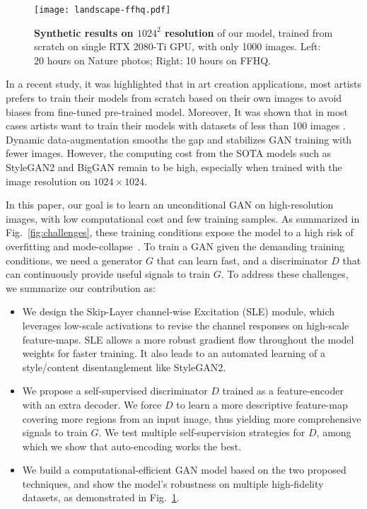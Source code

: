 \documentclass{article} \usepackage{iclr2021_conference,times}
\begin{document}
\begin{figure}[h]
\begin{center}
\texttt{[image: landscape-ffhq.pdf]}
\end{center}
\caption{\textbf{Synthetic results on $1024^2$ resolution} of our model, trained from scratch on single RTX 2080-Ti GPU, with only 1000 images. Left: 20 hours on Nature photos; Right: 10 hours on FFHQ.}
\label{fig:quality-ours}
\end{figure}

In a recent study, it was highlighted that in art creation applications, most artists prefers to train their models from scratch based on their own images to avoid biases from fine-tuned pre-trained model. Moreover, It was shown that in most cases artists want to train their models with datasets of less than 100 images \citep{elgammal2020artists}. Dynamic data-augmentation \citep{karras2020training,zhao2020differentiable} smooths the gap and stabilizes GAN training with fewer images. However, the computing cost from the SOTA models such as StyleGAN2 \citep{karras2020analyzing} and BigGAN \citep{brock2018large} remain to be high, especially when trained with the image resolution on $1024\times1024$. 

In this paper, our goal is to learn an unconditional GAN on high-resolution images, with low computational cost and few training samples. As summarized in Fig.~\ref{fig:challenges}, these training conditions expose the model to a high risk of  overfitting and mode-collapse~\citep{arjovsky2017towards,zhang2018pa}. To train a GAN given the demanding training conditions, we need a generator $G$ that can learn fast, and a discriminator $D$ that can continuously provide useful signals to train $G$. To address these challenges, we summarize our contribution as:
\begin{itemize}
\item We design the Skip-Layer channel-wise Excitation (SLE) module, which leverages low-scale activations to revise the channel responses on high-scale feature-maps. SLE allows a more robust gradient flow throughout the model weights for faster training. It also leads to an automated learning of a style/content disentanglement like StyleGAN2.  
\item We propose a self-supervised discriminator $D$ trained as a feature-encoder with an extra decoder. We force $D$ to learn a more descriptive feature-map covering more regions from an input image, thus yielding more comprehensive signals to train $G$. We test multiple self-supervision strategies for $D$, among which we show that auto-encoding works the best.
\item We build a computational-efficient GAN model based on the two proposed techniques, and show the model's robustness on multiple high-fidelity datasets, as demonstrated in Fig.~\ref{fig:quality-ours}.
\end{itemize}
\end{document}
